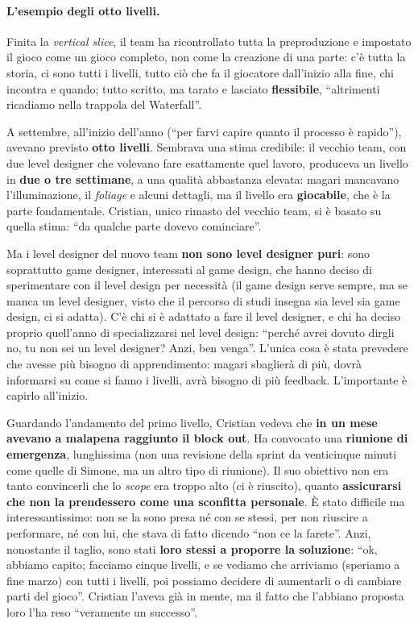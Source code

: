 \paragraph{L'esempio degli otto livelli.} Finita la \emph{vertical slice}, il
team ha ricontrollato tutta la preproduzione e impostato il gioco come un gioco
completo, non come la creazione di una parte: c'è tutta la storia, ci sono
tutti i livelli, tutto ciò che fa il giocatore dall'inizio alla fine, chi
incontra e quando; tutto scritto, ma tarato e lasciato \textbf{flessibile},
``altrimenti ricadiamo nella trappola del Waterfall''.

A settembre, all'inizio dell'anno (``per farvi capire quanto il processo è
rapido''), avevano previsto \textbf{otto livelli}. Sembrava una stima
credibile: il vecchio team, con due level designer che volevano fare
esattamente quel lavoro, produceva un livello in \textbf{due o tre settimane}, a
una qualità abbastanza elevata: magari mancavano l'illuminazione, il
\emph{foliage} e alcuni dettagli, ma il livello era \textbf{giocabile}, che è
la parte fondamentale. Cristian, unico rimasto del vecchio team, si è basato su
quella stima: ``da qualche parte dovevo cominciare''.

Ma i level designer del nuovo team \textbf{non sono level designer puri}: sono
soprattutto game designer, interessati al game design, che hanno deciso di
sperimentare con il level design per necessità (il game design serve sempre, ma
se manca un level designer, visto che il percorso di studi insegna sia level
sia game design, ci si adatta). C'è chi si è adattato a fare il level designer,
e chi ha deciso proprio quell'anno di specializzarsi nel level design: ``perché
avrei dovuto dirgli no, tu non sei un level designer? Anzi, ben venga''.
L'unica cosa è stata prevedere che avesse più bisogno di apprendimento: magari
sbaglierà di più, dovrà informarsi su come si fanno i livelli, avrà bisogno di
più feedback. L'importante è capirlo all'inizio.

Guardando l'andamento del primo livello, Cristian vedeva che \textbf{in un mese
avevano a malapena raggiunto il block out}. Ha convocato una \textbf{riunione
di emergenza}, lunghissima (non una revisione della sprint da venticinque
minuti come quelle di Simone, ma un altro tipo di riunione). Il suo obiettivo
non era tanto convincerli che lo \emph{scope} era troppo alto (ci è riuscito),
quanto \textbf{assicurarsi che non la prendessero come una sconfitta
personale}. È stato difficile ma interessantissimo: non se la sono presa né con
se stessi, per non riuscire a performare, né con lui, che stava di fatto
dicendo ``non ce la farete''. Anzi, nonostante il taglio, sono stati
\textbf{loro stessi a proporre la soluzione}: ``ok, abbiamo capito; facciamo
cinque livelli, e se vediamo che arriviamo (speriamo a fine marzo) con tutti i
livelli, poi possiamo decidere di aumentarli o di cambiare parti del gioco''.
Cristian l'aveva già in mente, ma il fatto che l'abbiano proposta loro l'ha reso
``veramente un successo''.

